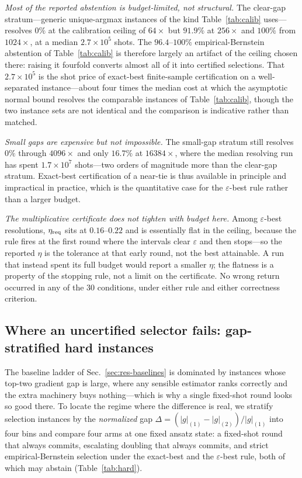 \documentclass[aps,pra,reprint,superscriptaddress,nofootinbib,floatfix]{revtex4-2}
\begin{document}
\emph{Most of the reported abstention is budget-limited, not structural.} The clear-gap stratum---generic unique-argmax instances of the kind Table~\ref{tab:calib} uses---resolves $0\%$ at the calibration ceiling of $64\times$ but $91.9\%$ at $256\times$ and $100\%$ from $1024\times$, at a median $2.7\times10^5$ shots. The $96.4$--$100\%$ empirical-Bernstein abstention of Table~\ref{tab:calib} is therefore largely an artifact of the ceiling chosen there: raising it fourfold converts almost all of it into certified selections. That $2.7\times10^5$ is the shot price of exact-best finite-sample certification on a well-separated instance---about four times the median cost at which the asymptotic normal bound resolves the comparable instances of Table~\ref{tab:calib}, though the two instance sets are not identical and the comparison is indicative rather than matched.

\emph{Small gaps are expensive but not impossible.} The small-gap stratum still resolves $0\%$ through $4096\times$ and only $16.7\%$ at $16384\times$, where the median resolving run has spent $1.7\times10^{7}$ shots---two orders of magnitude more than the clear-gap stratum. Exact-best certification of a near-tie is thus available in principle and impractical in practice, which is the quantitative case for the $\varepsilon$-best rule rather than a larger budget.

\emph{The multiplicative certificate does not tighten with budget here.} Among $\varepsilon$-best resolutions, $\eta_{\rm req}$ sits at $0.16$--$0.22$ and is essentially flat in the ceiling, because the rule fires at the first round where the intervals clear $\varepsilon$ and then stops---so the reported $\eta$ is the tolerance at that early round, not the best attainable. A run that instead spent its full budget would report a smaller $\eta$; the flatness is a property of the stopping rule, not a limit on the certificate. No wrong return occurred in any of the $30$ conditions, under either rule and either correctness criterion.

\subsection{Where an uncertified selector fails: gap-stratified hard instances}
\label{sec:res-hard}

The baseline ladder of Sec.~\ref{sec:res-baselines} is dominated by instances whose top-two gradient gap is large, where any sensible estimator ranks correctly and the extra machinery buys nothing---which is why a single fixed-shot round looks so good there. To locate the regime where the difference is real, we stratify selection instances by the \emph{normalized} gap $\Delta=(|g|_{(1)}-|g|_{(2)})/|g|_{(1)}$ into four bins and compare four arms at one fixed ansatz state: a fixed-shot round that always commits, escalating doubling that always commits, and strict empirical-Bernstein selection under the exact-best and the $\varepsilon$-best rule, both of which may abstain (Table~\ref{tab:hard}).
\end{document}
